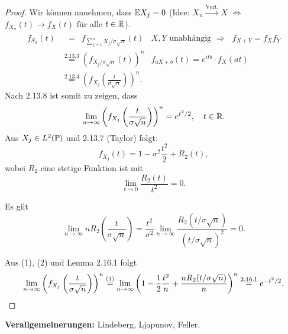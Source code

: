 \begin{proof}
  Wir können annehmen, dass $\mathbb{E} X_j = 0$ (Idee: $X_n \xrightarrow{\text{Vert.}}
  X$ $\Leftrightarrow$ $f_{X_n}(t) \to f_X(t)$ für alle $t \in \mathbb{R}$).
  \begin{align*}
    f_{S_n}(t)
    &\overset{\phantom{2.13.3}}{=} f_{\sum_{j=1}^n X_j / \sigma \sqrt{n}} (t)
    & \text{$X, Y$ unabhängig $\Rightarrow$ $f_{X+Y} = f_X f_Y$} \\
    &\overset{2.13.3}{=} (f_{X_j / \sigma \sqrt{n}} (t))^n
    & \text{$f_{aX + b}(t) = e^{itb} \cdot f_X(at)$} \\
    &\overset{2.13.4}{=} \left(f_{X_j} \left( \frac{t}{\sigma \sqrt{n}} \right) \right)^n.
  \end{align*}
  Nach 2.13.8 ist somit zu zeigen, dass
  \[ \lim_{n \to \infty} \left(f_{X_j} \left( \frac{t}{\sigma \sqrt{n}} \right)
    \right)^n = e^{t^2/2}, \quad t \in \mathbb{R}. \]
  Aus $X_j \in L^2(\mathbb{P})$ und 2.13.7 (Taylor) folgt:
  \[ f_{X_j}(t) = 1 - \sigma^2 \frac{t^2}{2} + R_2(t), \tag{1} \]
  wobei $R_2$ eine stetige Funktion ist mit
  \[ \lim_{t \to 0} \frac{R_2(t)}{t^2} = 0. \]

  Es gilt
  \[ \lim_{n \to \infty} n R_2 \left( \frac{t}{\sigma \sqrt{n}} \right) =
    \frac{t^2}{\sigma^2} \lim_{n \to \infty} \frac{R_2(t / \sigma \sqrt{n})}{(t
      / \sigma \sqrt{n})^2} = 0. \tag{2} \]

  Aus (1), (2) und Lemma 2.16.1 folgt
  \[ \lim_{n \to \infty}
    \left(f_{X_j} \left( \frac{t}{\sigma \sqrt{n}} \right) \right)^n
    \overset{(1)}{=} \lim_{n \to \infty}
    \left(  1 - \frac{1}{2} \frac{t^2}{n} + \frac{n R_2( t / \sigma \sqrt{n})}{n}
    \right)^n
    \overset{2.16.1}{=} e^{-t^2/2}. \qedhere
  \]
\end{proof}

\textbf{Verallgemeinerungen:} Lindeberg, Ljapunov, Feller.